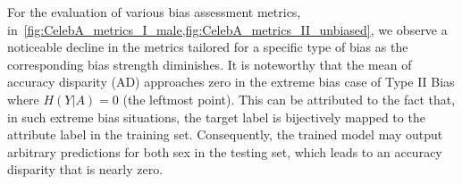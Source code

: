 For the evaluation of various bias assessment metrics, in~\cref{fig:CelebA_metrics_I_male,fig:CelebA_metrics_II_unbiased}, we observe a noticeable decline in the metrics tailored for a specific type of bias as the corresponding bias strength diminishes.
It is noteworthy that the mean of accuracy disparity (AD) approaches zero in the extreme bias case of Type II Bias where $H(Y|A)=0$ (the leftmost point).
This can be attributed to the fact that, in such extreme bias situations, the target label is bijectively mapped to the attribute label in the training set. Consequently, the trained model may output arbitrary predictions for both sex in the testing set, which leads to an accuracy disparity that is nearly zero.






